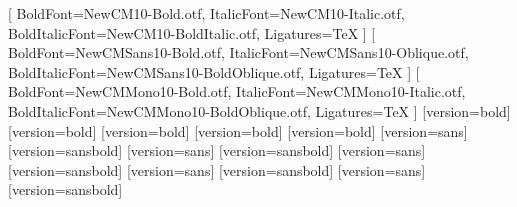 \setmainfont{NewCM10-Regular.otf}[
  BoldFont=NewCM10-Bold.otf,
  ItalicFont=NewCM10-Italic.otf,
  BoldItalicFont=NewCM10-BoldItalic.otf,
  Ligatures=TeX
]
\setsansfont{NewCMSans10-Regular.otf}[
  BoldFont=NewCMSans10-Bold.otf,
  ItalicFont=NewCMSans10-Oblique.otf,
  BoldItalicFont=NewCMSans10-BoldOblique.otf,
  Ligatures=TeX
]
\setmonofont{NewCMMono10-Regular.otf}[
  BoldFont=NewCMMono10-Bold.otf,
  ItalicFont=NewCMMono10-Italic.otf,
  BoldItalicFont=NewCMMono10-BoldOblique.otf,
  Ligatures=TeX
]
[version=bold]
\setmathfontface{}
\setmathfontface{}[version=bold]
\setmathfontface{}
\setmathfontface{}[version=bold]
\setmathfontface{}
\setmathfontface{}[version=bold]
\setmathfontface{}
\setmathfontface{}[version=bold]
\setoperatorfont\mathrm
{}[version=sans]
[version=sansbold]
\setmathfontface{}[version=sans]
\setmathfontface{}[version=sansbold]
\setmathfontface{}[version=sans]
\setmathfontface{}[version=sansbold]
\setmathfontface{}[version=sans]
\setmathfontface{}[version=sansbold]
\setmathfontface{}[version=sans]
\setmathfontface{}[version=sansbold]
